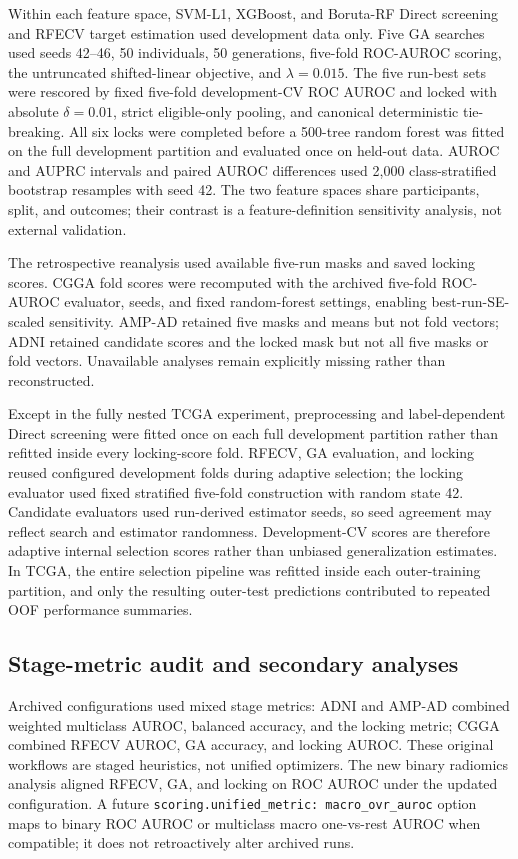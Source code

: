 Within each feature space, SVM-L1, XGBoost, and Boruta-RF Direct screening and RFECV target estimation used development data only. Five GA searches used seeds 42--46, 50 individuals, 50 generations, five-fold ROC-AUROC scoring, the untruncated shifted-linear objective, and \(\lambda=0.015\). The five run-best sets were rescored by fixed five-fold development-CV ROC AUROC and locked with absolute \(\delta=0.01\), strict eligible-only pooling, and canonical deterministic tie-breaking. All six locks were completed before a 500-tree random forest was fitted on the full development partition and evaluated once on held-out data. AUROC and AUPRC intervals and paired AUROC differences used 2,000 class-stratified bootstrap resamples with seed 42. The two feature spaces share participants, split, and outcomes; their contrast is a feature-definition sensitivity analysis, not external validation.

The retrospective reanalysis used available five-run masks and saved locking scores. CGGA fold scores were recomputed with the archived five-fold ROC-AUROC evaluator, seeds, and fixed random-forest settings, enabling best-run-SE-scaled sensitivity. AMP-AD retained five masks and means but not fold vectors; ADNI retained candidate scores and the locked mask but not all five masks or fold vectors. Unavailable analyses remain explicitly missing rather than reconstructed.

Except in the fully nested TCGA experiment, preprocessing and label-dependent Direct screening were fitted once on each full development partition rather than refitted inside every locking-score fold. RFECV, GA evaluation, and locking reused configured development folds during adaptive selection; the locking evaluator used fixed stratified five-fold construction with random state 42. Candidate evaluators used run-derived estimator seeds, so seed agreement may reflect search and estimator randomness. Development-CV scores are therefore adaptive internal selection scores rather than unbiased generalization estimates. In TCGA, the entire selection pipeline was refitted inside each outer-training partition, and only the resulting outer-test predictions contributed to repeated OOF performance summaries.

\subsection{Stage-metric audit and secondary analyses}

Archived configurations used mixed stage metrics: ADNI and AMP-AD combined weighted multiclass AUROC, balanced accuracy, and the locking metric; CGGA combined RFECV AUROC, GA accuracy, and locking AUROC. These original workflows are staged heuristics, not unified optimizers. The new binary radiomics analysis aligned RFECV, GA, and locking on ROC AUROC under the updated configuration. A future \texttt{scoring.unified\_metric: macro\_ovr\_auroc} option maps to binary ROC AUROC or multiclass macro one-vs-rest AUROC when compatible; it does not retroactively alter archived runs.

